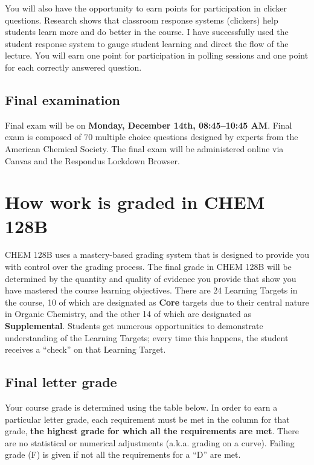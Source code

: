 You will also have the opportunity to earn points for participation in
clicker questions. Research shows that classroom response systems
(clickers) help students learn more and do better in the course. I have
successfully used the student response system to gauge student learning
and direct the flow of the lecture. You will earn one point for
participation in polling sessions and one point for each correctly
answered question.

\hypertarget{final-examination}{%
\subsection{Final examination}\label{final-examination}}

Final exam will be on \textbf{Monday, December 14th, 08:45--10:45 AM}.
Final exam is composed of 70 multiple choice questions designed by
experts from the American Chemical Society. The final exam will be
administered online via Canvas and the Respondus Lockdown Browser.

\hypertarget{grading}{%
\section{How work is graded in CHEM 128B}\label{grading}}

CHEM 128B uses a mastery-based grading system that is designed to
provide you with control over the grading process. The final grade in
CHEM 128B will be determined by the quantity and quality of evidence you
provide that show you have mastered the course learning objectives.
There are 24 Learning Targets in the course, 10 of which are designated
as \textbf{Core} targets due to their central nature in Organic
Chemistry, and the other 14 of which are designated as
\textbf{Supplemental}. Students get numerous opportunities to
demonstrate understanding of the Learning Targets; every time this
happens, the student receives a ``check'' on that Learning Target.

\hypertarget{final-letter-grade}{%
\subsection{Final letter grade}\label{final-letter-grade}}

Your course grade is determined using the table below. In order to earn
a particular letter grade, each requirement must be met in the column
for that grade, \textbf{the highest grade for which all the requirements
are met}. There are no statistical or numerical adjustments (a.k.a.
grading on a curve). Failing grade (F) is given if not all the
requirements for a ``D'' are met.

